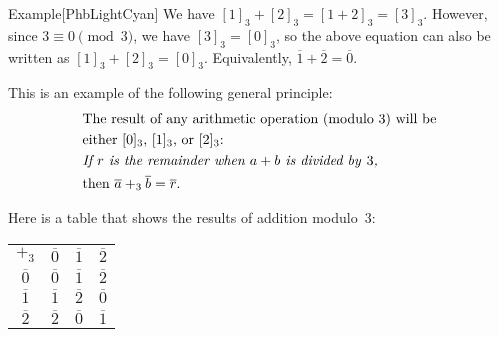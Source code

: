 \documentclass[../MATH-2000-Notes.tex]{subfiles}
\begin{document}
\begin{commentbox}{Example}[{PhbLightCyan}]
    We have $[1]_3 + [2]_3 = [1 + 2]_3 = [3]_3$. However, since $3 \equiv 0 \pmod{3}$, we have $[3]_3 = [0]_3$, so the above equation can also be written as $[1]_3 + [2]_3 = [0]_3$. Equivalently, $\overline{1} + \overline{2} = \overline{0}$.

    This is an example of the following general principle:
    $$ 
    \begin{aligned}
        &\text{The result of any arithmetic operation (modulo~$3$) will be}\\
        &\text{either $[0]_3$, $[1]_3$, or~$[2]_3$:} \\
        &\text{\it If $r$ is the remainder when $a + b$ is divided by\/~$3$,}\\
        &\text{then $\overline{a} \mathbin{+_3} \overline{b} = \overline{r}$.} 
    \end{aligned}
    $$

    Here is a table that shows the results of addition modulo~$3$:
    \begin{center} \begin{tabular}{c||c|c|c}
            $+_3$          & $\overline{0}$ & $\overline{1}$ & $\overline{2}$ \\
            \noalign{\hrule}
            \noalign{\smallskip}
            \noalign{\hrule}
            $\overline{0}$ & $\overline{0}$ & $\overline{1}$ & $\overline{2}$ \\
            \noalign{\hrule}
            $\overline{1}$ & $\overline{1}$ & $\overline{2}$ & $\overline{0}$ \\
            \noalign{\hrule}
            $\overline{2}$ & $\overline{2}$ & $\overline{0}$ & $\overline{1}$ \\
        \end{tabular}
    \end{center}
\end{commentbox}
\newpage
\end{document}
